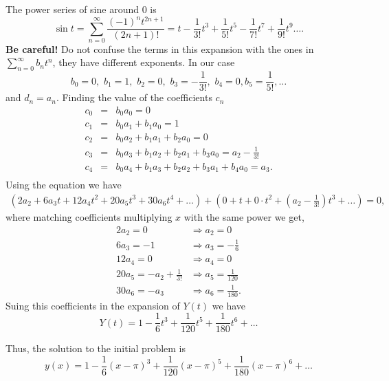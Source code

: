 \documentclass[11pt]{article}
\begin{document}
\begin{solution}
The power series of sine around $0$ is 
\[\sin t =\sum_{n=0}^{\infty}\frac{(-1)^{n}t^{2n+1}}{(2n+1)!}=t - \frac{1}{3!}t^{3}+ \frac{1}{5!}t^{5}-\frac{1}{7!}t^{7}+\frac{1}{9!}t^{9}\dots.\]
\textbf{Be careful!} Do not confuse the terms in this expansion with the ones in $\sum_{n=0}^{\infty} b_{n}t^{n}$, they have different exponents. In our case
\[b_{0}=0,\,\, b_{1}=1, \,\,b_{2}=0, \,\,b_{3}=-\frac{1}{3!},\,\,b_{4}=0, b_{5}=\frac{1}{5!}, \dots\]
and $d_{n}=a_{n}$.
Finding the value of the coefficients $c_{n}$
\begin{eqnarray*}
c_{0} & = & b_{0}a_{0} = 0\\
c_{1} & = & b_{0}a_{1} + b_{1}a_{0} = 1 \\
c_{2} & = & b_{0}a_{2} + b_{1}a_{1} + b_{2}a_{0} = 0 \\
c_{3} & = & b_{0}a_{3} + b_{1}a_{2} + b_{2}a_{1} + b_{3}a_{0} = a_{2} - \frac{1}{3!} \\
c_{4} & = & b_{0}a_{4} + b_{1}a_{3} + b_{2}a_{2} + b_{3}a_{1} + b_{4}a_{0} = a_{3}. \\
\end{eqnarray*}
Using the equation we have
\begin{gather}
\left(2a_{2} + 6 a_{3}t +12 a_{4}t^{2}+20 a_{5}t^{3}+30 a_{6}t^{4}+\dots\right)
     +\left( 0 + t + 0 \cdot t^{2}+ \left(a_{2}-\frac{1}{3!}\right)t^{3}+\dots\right) =0,
\end{gather}
where matching coefficients multiplying $x$ with the same power we get,
\begin{align*}
  2a_{2} = 0 & \Rightarrow a_{2} = 0 \\
  6 a_{3} = -1 & \Rightarrow a_{3} = -\frac{1}{6} \\
  12 a_{4}= 0 & \Rightarrow a_{4} = 0 \\
  20 a_{5} = -a_{2} +\frac{1}{3!} & \Rightarrow a_{5} = \frac{1}{120}\\
  30 a_{6} = -a_{3} & \Rightarrow a_{6} = \frac{1}{180}.
\end{align*}
Suing this coefficients in the expansion of $Y(t)$ we have
\[Y(t)=1-\frac{1}{6}t^{3}+\frac{1}{120}t^{5}+\frac{1}{180}t^{6}+\dots\]

Thus, the solution to the initial problem is 
\[\boxed{y(x)=1-\frac{1}{6}(x-\pi)^{3}+\frac{1}{120}(x-\pi)^{5}+\frac{1}{180}(x-\pi)^{6}+\dots}\]
\end{solution}
\end{document}
